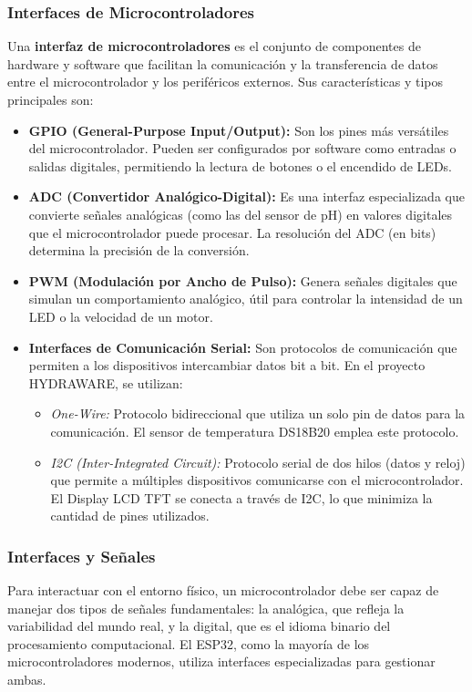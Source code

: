 \documentclass[a4paper,12pt]{article}
\begin{document}
	\subsubsection{Interfaces de Microcontroladores}
	Una \textbf{interfaz de microcontroladores} es el conjunto de componentes de hardware y software que facilitan la comunicación y la transferencia de datos entre el microcontrolador y los periféricos externos. Sus características y tipos principales son:
	
	\begin{itemize}
		\item \textbf{GPIO (General-Purpose Input/Output):} Son los pines más versátiles del microcontrolador. Pueden ser configurados por software como entradas o salidas digitales, permitiendo la lectura de botones o el encendido de LEDs.
		\item \textbf{ADC (Convertidor Analógico-Digital):} Es una interfaz especializada que convierte señales analógicas (como las del sensor de pH) en valores digitales que el microcontrolador puede procesar. La resolución del ADC (en bits) determina la precisión de la conversión.
		\item \textbf{PWM (Modulación por Ancho de Pulso):} Genera señales digitales que simulan un comportamiento analógico, útil para controlar la intensidad de un LED o la velocidad de un motor.
		\item \textbf{Interfaces de Comunicación Serial:} Son protocolos de comunicación que permiten a los dispositivos intercambiar datos bit a bit. En el proyecto HYDRAWARE, se utilizan:
		\begin{itemize}
			\item \textit{One-Wire:} Protocolo bidireccional que utiliza un solo pin de datos para la comunicación. El sensor de temperatura DS18B20 emplea este protocolo.
			\item \textit{I2C (Inter-Integrated Circuit):} Protocolo serial de dos hilos (datos y reloj) que permite a múltiples dispositivos comunicarse con el microcontrolador. El Display LCD TFT se conecta a través de I2C, lo que minimiza la cantidad de pines utilizados.
		\end{itemize}
	\end{itemize}
	
	\subsubsection{Interfaces y Señales}
	Para interactuar con el entorno físico, un microcontrolador debe ser capaz de manejar dos tipos de señales fundamentales: la analógica, que refleja la variabilidad del mundo real, y la digital, que es el idioma binario del procesamiento computacional. El ESP32, como la mayoría de los microcontroladores modernos, utiliza interfaces especializadas para gestionar ambas.
	
\end{document}
